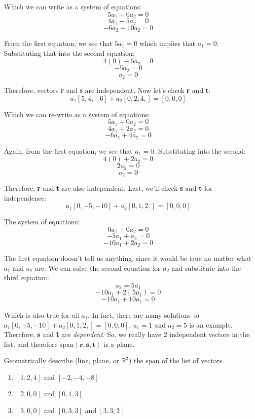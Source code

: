 Which we can write as a system of equations:
$$5a_1 + 0a_2 = 0$$
$$4a_1 - 5a_2 = 0$$
$$-6a_2 -10a_2 = 0$$

From the first equation, we see that $5a_1 = 0$ which implies that $a_1 = 0$. 
Substituting that into the second equation:
$$4(0) - 5a_2 = 0$$
$$-5a_2 = 0$$
$$a_2 = 0$$

Therefore, vectors \textbf{r} and \textbf{s} are independent. Now let's check 
\textbf{r} and \textbf{t}:
$$a_1 \left[5, 4, -6 \right] + a_2 \left[ 0, 2, 4, \right] = \left[ 0, 0, 0 
\right]$$

Which we can re-write as a system of equations:
$$5a_1 + 0a_2 = 0$$
$$4a_1 + 2a_2 = 0$$
$$-6a_1 + 4a_2 = 0$$

Again, from the first equation, we see that $a_1 = 0$. Substituting into the 
second:
$$4(0) + 2a_2 = 0$$
$$2a_2 = 0$$
$$a_2 = 0$$

Therefore, \textbf{r} and \textbf{t} are also independent. Last, we'll check 
\textbf{s} and \textbf{t} for independence:
$$a_1 \left[0, -5, -10 \right] + a_2 \left[ 0, 1, 2, \right] = \left[ 0, 0, 0 
\right]$$

The system of equations:
$$0a_1 + 0a_2 = 0$$
$$-5a_1 + a_2 = 0$$
$$-10a_1 + 2a_2 = 0$$

The first equation doesn't tell us anything, since it would be true no matter 
what $a_1$ and $a_2$ are. We can solve the second equation for $a_2$ and 
substitute into the third equation:
$$a_2 = 5a_1$$
$$-10a_1 + 2 \left(5a_1 \right) = 0$$
$$-10a_1 + 10a_1 = 0$$

Which is also true for all $a_1$. In fact, there are many solutions to $a_1 
\left[0, -5, -10 \right] + a_2 \left[ 0, 1, 2, \right] = \left[ 0, 0, 0 
\right]$, $a_1 = 1$ and $a_2 = 5$ is an example. Therefore, \textbf{s} and 
\textbf{t} are \textit{dependent}. So, we really have 2 independent vectors in 
the list, and therefore $\text{span}(\mathbf{r}, \mathbf{s}, \mathbf{t})$ is a 
plane. 

\begin{Exercise}[title = {Determining Span}, label = span1]
Geometrically describe (line, plane, or $\mathbb{R}^3$) the span of the list 
of vectors.
\begin{enumerate}
\item $\left[ 1, 2, 4 \right]$ and $\left[-2, -4, -8 \right]$
\item $\left[ 2, 0, 0 \right]$ and $\left[ 0, 1, 3 \right]$
\item $\left[ 3, 0, 0 \right]$ and $\left[ 0, 3, 3 \right]$ and $\left[3, 3, 2 
\right]$
\end{enumerate}
\end{Exercise}

